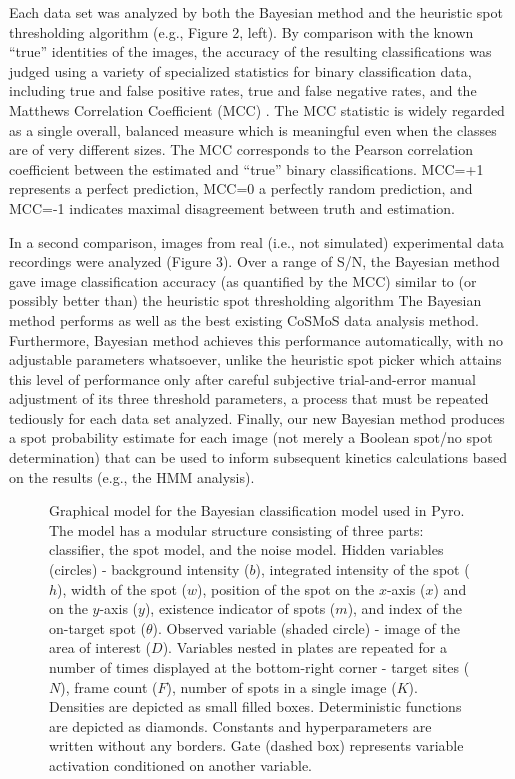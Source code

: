 Each data set was analyzed by both the Bayesian method and the heuristic spot thresholding algorithm (e.g., Figure 2, left). By comparison with the known “true” identities of the images, the accuracy of the resulting classifications was judged using a variety of specialized statistics for binary classification data, including true and false positive rates, true and false negative rates, and the Matthews Correlation Coefficient (MCC) \citep{fawcett_introduction_2006, matthews_comparison_1975}. The MCC statistic is widely regarded as a single overall, balanced measure which is meaningful even when the classes are of very different sizes. The MCC corresponds to the Pearson correlation coefficient between the estimated and “true” binary classifications. MCC=+1 represents a perfect prediction, MCC=0 a perfectly random prediction, and MCC=-1 indicates maximal disagreement between truth and estimation.

In a second comparison, images from real (i.e., not simulated) experimental data recordings were analyzed (Figure 3). Over a range of S/N, the Bayesian method gave image classification accuracy (as quantified by the MCC) similar to (or possibly better than) the heuristic spot thresholding algorithm The Bayesian method performs as well as the best existing CoSMoS data analysis method. Furthermore, Bayesian method achieves this performance automatically, with no adjustable parameters whatsoever, unlike the heuristic spot picker which attains this level of performance only after careful subjective trial-and-error manual adjustment of its three threshold parameters, a process that must be repeated tediously for each data set analyzed. Finally, our new Bayesian method produces a spot probability estimate for each image (not merely a Boolean spot/no spot determination) that can be used to inform subsequent kinetics calculations based on the results (e.g., the HMM analysis).

\begin{figure}[ht]
  \begin{center}
    
  \end{center}
  \caption{Graphical model for the Bayesian classification model used in Pyro. The model has a modular structure consisting of three parts: classifier, the spot model, and the noise model. Hidden variables (circles) - background intensity ($b$), integrated intensity of the spot ($h$), width of the spot ($w$), position of the spot on the $x$-axis ($x$) and on the $y$-axis ($y$), existence indicator of spots ($m$), and index of the on-target spot ($\theta$). Observed variable (shaded circle) - image of the area of interest ($D$). Variables nested in plates are repeated for a number of times displayed at the bottom-right corner - target sites ($N$), frame count ($F$), number of spots in a single image ($K$). Densities are depicted as  small filled boxes. Deterministic functions are depicted as diamonds. Constants and hyperparameters are written without any borders. Gate (dashed box) represents variable activation conditioned on another variable.}
\end{figure}


